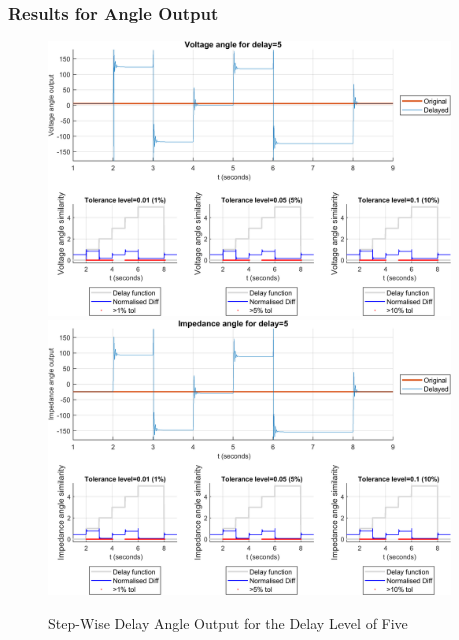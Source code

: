 \subsubsection{Results for Angle Output}


\begin{figure}
    \caption{Step-Wise Delay Angle Output for the Delay Level of Five}
    \includegraphics[width=0.95\textwidth]{PMUsim-figures/DelayOf_5/Step_vAngle.png}    
    \includegraphics[width=0.95\textwidth]{PMUsim-figures/DelayOf_5/Step_iAngle.png}    
    \label{fig:PMUsimStep_Five_Angle}
        \begin{small}
     \end{small}
\end{figure}

